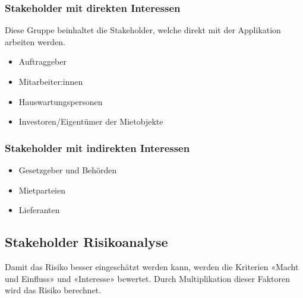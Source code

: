 \subsubsection{Stakeholder mit direkten Interessen}
Diese Gruppe beinhaltet die Stakeholder, welche direkt mit der Applikation arbeiten werden.

\begin{itemize}
  \item Auftraggeber
  \item Mitarbeiter:innen
  \item Hauswartungspersonen
  \item Investoren/Eigentümer der Mietobjekte
\end{itemize}

\subsubsection{Stakeholder mit indirekten Interessen}

\begin{itemize}
  \item Gesetzgeber und Behörden
  \item Mietparteien
  \item Lieferanten
\end{itemize}

\subsection{Stakeholder Risikoanalyse}
Damit das Risiko besser eingeschätzt werden kann, werden die Kriterien «Macht und Einfluss» und «Interesse» bewertet. Durch Multiplikation dieser Faktoren wird das Risiko berechnet.

